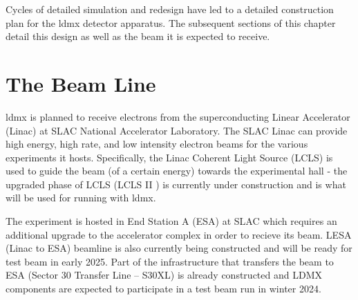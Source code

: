 Cycles of detailed simulation and redesign have led to a detailed construction plan for the
\ac{ldmx} detector apparatus. The subsequent sections of this chapter detail this design as well as
the beam it is expected to receive.

\section{The Beam Line}
\ac{ldmx} is planned to receive electrons from the superconducting Linear Accelerator (Linac)
at SLAC National Accelerator Laboratory.
The SLAC Linac can provide high energy, high rate, and low intensity electron beams for
the various experiments it hosts.
Specifically, the Linac Coherent Light Source (LCLS) is used to guide the beam (of a certain energy)
towards the experimental hall
- the upgraded phase of LCLS (LCLS II \cite{lcls-ii}) is currently under construction and is what will
be used for running with \ac{ldmx}.

The experiment is hosted in End Station A (ESA) at SLAC which requires an additional upgrade to the
accelerator complex in order to recieve its beam. LESA (Linac to ESA) beamline \cite{lesa-design} is also
currently being constructed and will be ready for test beam in early 2025. Part of the
infrastructure that transfers the beam to ESA (Sector 30 Transfer Line -- S30XL) is already
constructed and LDMX components are expected to participate in a test beam run in winter 2024.

